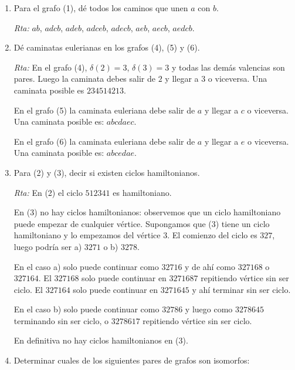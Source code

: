 \documentclass[12pt,spanish,makeidx]{amsbook}
\theoremstyle{definition}
\theoremstyle{remark}
\newcommand{\rta}{\noindent\textit{Rta: }}
\begin{document}
\begin{enumerate}
\begin{enumerate}
		\rta En (1) hay varios $K_3$: $abe$, $bec$, $aed$, $ecd$. En (2) El subgrafo con vértices $1,2,3,4$  es un $K_4$. En (3) no hay grafos completos. En (4) hay varios subrafos isomorfos s $K_3$, por ejemplo el formado por los vértices $1,4,5$. En (5) no hay subgrafos completos. En (6) hay un $K_3$ formado por los vértices $a,e,d$. En (7) no hay grafos completos. 
		
		\item Para el grafo (1), dé todos los caminos que unen $a$ con $b$.
		
		\rta $ab$, $adcb$, $adeb$, $adceb$, $adecb$, $aeb$, $aecb$, $aedcb$.  
		
		
		\item Dé caminatas eulerianas en los grafos (4), (5) y (6).
		
		\rta  En  el  grafo (4), $\delta(2)=3$, $\delta(3)=3$ y todas las demás valencias son pares. Luego la caminata debes salir de $2$ y llegar a $3$ o viceversa. Una caminata posible es $234514213$.    
		
		En  el grafo (5) la caminata euleriana debe salir de $a$ y llegar a $c$ o viceversa. Una caminata posible es: $abcdaec$.
		
		En  el grafo (6) la caminata euleriana debe salir de $a$ y llegar a $e$ o viceversa. Una caminata posible es: $abcedae$.
		
		\item Para (2) y (3), decir si existen ciclos hamiltonianos.
		
		\rta En (2) el  ciclo $512341$ es hamiltoniano. 
		
		
		En (3) no hay ciclos hamiltonianos: observemos  que un ciclo hamiltoniano puede empezar de cualquier vértice. Supongamos que (3) tiene un ciclo hamiltoniano y lo empezamos del vértice $3$. El comienzo del ciclo es $327$, luego podría ser  a) $3271$ o  b) $3278$. 
		
		En  el caso a) solo  puede continuar como $32716$ y  de ahí  como $327168$ o $327164$. El $327168$ solo puede continuar en $3271687$ repitiendo vértice sin ser ciclo. El  $327164$ solo puede continuar en $3271645$ y ahí terminar  sin ser ciclo. 
		
		En  el caso b) solo puede continuar como $32786$ y luego  como $3278645$ terminando sin ser ciclo,  o $3278617$ repitiendo vértice sin ser ciclo. 
		
		En  definitiva no hay ciclos hamiltonianos en (3). 
		
		\item Determinar cuales de los siguientes pares de grafos son isomorfos:
		

\end{enumerate}
\end{enumerate}
\end{document}
